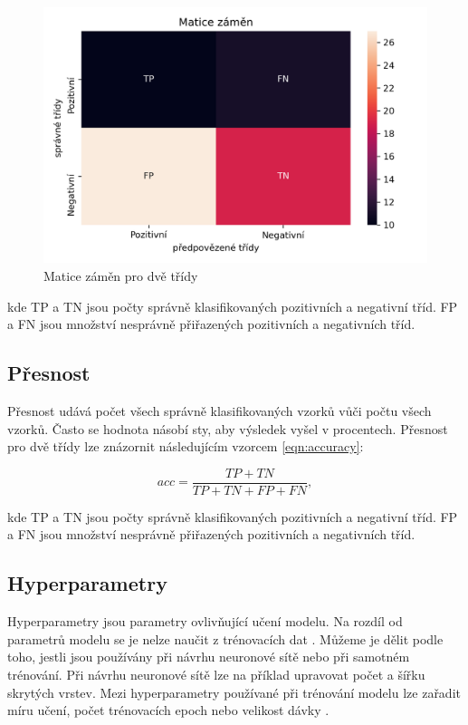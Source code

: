 \documentclass[FM,BP]{tulthesis}
\begin{document}
\begin{figure}[h]
\centerline{\includegraphics[scale=.7]{conf_matrix-example.png}}
\caption{Matice záměn pro dvě třídy}
\label{fig:conf_matrix-example}
\end{figure}
\FloatBarrier

kde TP a TN jsou počty správně klasifikovaných pozitivních a negativní tříd. FP a FN jsou množství nesprávně přiřazených pozitivních a negativních tříd.

\subsection{Přesnost} %
Přesnost udává počet všech správně klasifikovaných vzorků vůči počtu všech vzorků. Často se hodnota násobí sty, aby výsledek vyšel v procentech. Přesnost pro dvě třídy lze znázornit následujícím vzorcem \ref{eqn:accuracy}:

\begin{equation}
\label{eqn:accuracy}
acc = \frac{TP + TN}{TP + TN + FP + FN},
\end{equation}

kde TP a TN jsou počty správně klasifikovaných pozitivních a negativní tříd. FP a FN jsou množství nesprávně přiřazených pozitivních a negativních tříd. 

\subsection{Hyperparametry} %
Hyperparametry jsou parametry ovlivňující učení modelu. Na rozdíl od parametrů modelu se je nelze naučit z trénovacích dat \cite{geron2019hands}. Můžeme je dělit podle toho, jestli jsou používány při návrhu neuronové sítě nebo při samotném trénování. Při návrhu neuronové sítě lze na příklad upravovat počet a šířku skrytých vrstev. Mezi hyperparametry používané při trénování modelu lze zařadit míru učení, počet trénovacích epoch nebo velikost dávky \cite{dagli_2021}.
\end{document}
